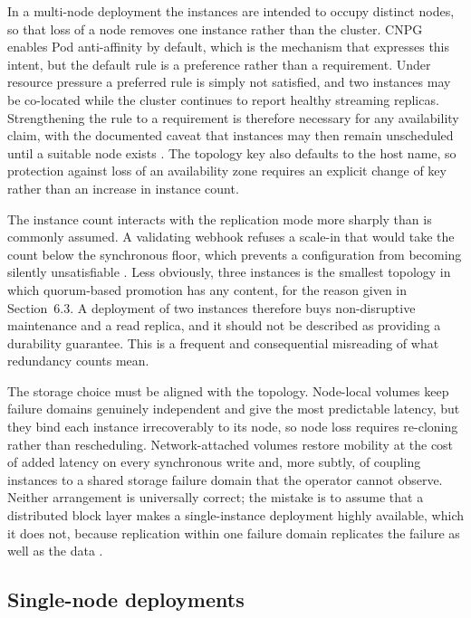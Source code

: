 \documentclass[11pt,a4paper]{article}
\begin{document}
In a multi-node deployment the instances are intended to occupy distinct nodes, so that loss of a node removes one instance rather than the cluster. CNPG enables Pod anti-affinity by default, which is the mechanism that expresses this intent, but the default rule is a preference rather than a requirement. Under resource pressure a preferred rule is simply not satisfied, and two instances may be co-located while the cluster continues to report healthy streaming replicas. Strengthening the rule to a requirement is therefore necessary for any availability claim, with the documented caveat that instances may then remain unscheduled until a suitable node exists \cite{cnpg-api}. The topology key also defaults to the host name, so protection against loss of an availability zone requires an explicit change of key rather than an increase in instance count.

The instance count interacts with the replication mode more sharply than is commonly assumed. A validating webhook refuses a scale-in that would take the count below the synchronous floor, which prevents a configuration from becoming silently unsatisfiable \cite{cnpg-resource-management}. Less obviously, three instances is the smallest topology in which quorum-based promotion has any content, for the reason given in Section~6.3. A deployment of two instances therefore buys non-disruptive maintenance and a read replica, and it should not be described as providing a durability guarantee. This is a frequent and consequential misreading of what redundancy counts mean.

The storage choice must be aligned with the topology. Node-local volumes keep failure domains genuinely independent and give the most predictable latency, but they bind each instance irrecoverably to its node, so node loss requires re-cloning rather than rescheduling. Network-attached volumes restore mobility at the cost of added latency on every synchronous write and, more subtly, of coupling instances to a shared storage failure domain that the operator cannot observe. Neither arrangement is universally correct; the mistake is to assume that a distributed block layer makes a single-instance deployment highly available, which it does not, because replication within one failure domain replicates the failure as well as the data \cite{gray-replication}.

\subsection{Single-node deployments}
\end{document}
